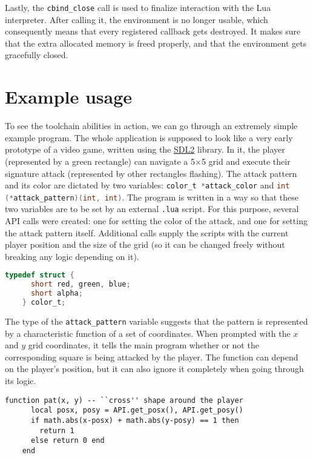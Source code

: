 \documentclass[polish, english]{iithesis}
\begin{document}
    Lastly, the \texttt{cbind\_close} call is used to finalize interaction with the Lua interpreter.
    After calling it, the environment is no longer usable, which consequently means that every registered callback gets destroyed.
    It makes sure that the extra allocated memory is freed properly, and that the environment gets gracefully closed.
\chapter{Example usage}
  To see the toolchain abilities in action, we can go through an extremely simple example program.
  The whole application is supposed to look like a very early prototype of a video game, written using the \href{https://www.libsdl.org/}{SDL2} library.
  In it, the player (represented by a green rectangle) can navigate a 5$\times$5 grid and execute their signature attack (represented by other rectangles flashing).
  The attack pattern and its color are dictated by two variables: \lstinline[language=c]|color_t *attack_color| and \lstinline[language=c]|int (*attack_pattern)(int, int)|.
  The program is written in a way so that these two variables are to be set by an external \texttt{.lua} script.
  For this purpose, several API calls were created: one for setting the color of the attack, and one for setting the attack pattern itself.
  Additional calls supply the scripts with the current player position and the size of the grid (so it can be changed freely without breaking any logic depending on it).
  \begin{lstlisting}[language=c, caption=\texttt{color\_t type definition}]
    typedef struct {
      short red, green, blue;
      short alpha;
    } color_t;
  \end{lstlisting}

  The type of the \texttt{attack\_pattern} variable suggests that the pattern is represented by a characteristic function of a set of coordinates.
  When prompted with the $x$ and $y$ grid coordinates, it tells the main program whether or not the corresponding square is being attacked by the player.
  The function can depend on the player's position, but it can also ignore it completely when going through its logic.
  \begin{lstlisting}[language={[5.2]Lua}, caption=Example pattern dictating function]
    function pat(x, y) -- ``cross'' shape around the player
      local posx, posy = API.get_posx(), API.get_posy()
      if math.abs(x-posx) + math.abs(y-posy) == 1 then 
        return 1
      else return 0 end
    end 
  \end{lstlisting}
\end{document}
